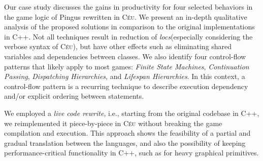 \documentclass[10pt, conference, compsocconf]{IEEEtran}
\newcommand{\CEU}{\textsc{C\'{e}u}\xspace}
\newcommand{\locs}{\emph{locs}\xspace}
\begin{document}
Our case study discusses the gains in productivity for four selected behaviors
in the game logic of Pingus rewritten in \CEU.
We present an in-depth qualitative analysis of the proposed solutions in
comparison to the original implementations in C++.
%
Not all techniques result in reduction of \locs (especially considering the
verbose syntax of \CEU), but have other effects such as eliminating shared
variables and dependencies between classes.
%
We also identify four control-flow patterns that likely apply to most games:
        \emph{Finite State Machines},
        \emph{Continuation Passing},
        \emph{Dispatching Hierarchies}, and
        \emph{Lifespan Hierarchies}.
%
In this context, a control-flow pattern is a recurring technique to describe
execution dependency and/or explicit ordering between statements.

We employed a \emph{live code rewrite}, i.e., starting from the original
codebase in C++, we reimplemented it piece-by-piece in \CEU without breaking
the game compilation and execution.
%
This approach shows the feasibility of a partial and gradual translation
between the languages, and also the possibility of keeping performance-critical
functionality in C++, such as for heavy graphical primitives.

\end{document}
